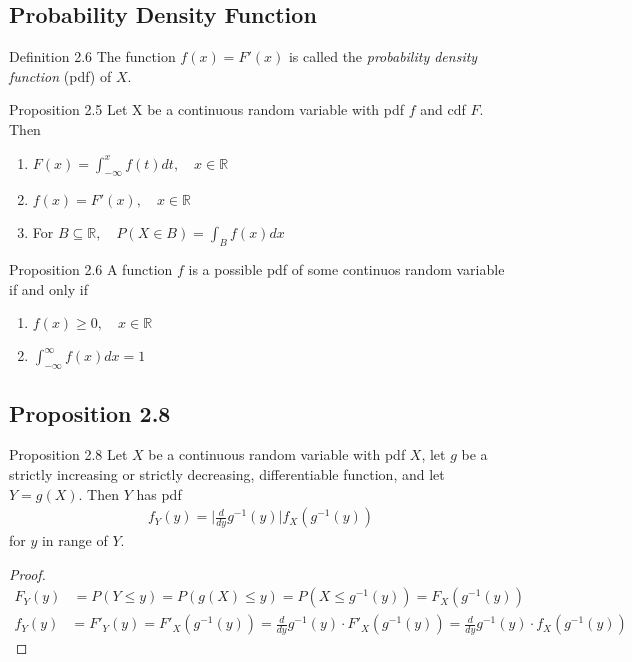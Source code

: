 \subsection{Probability Density Function}
\begin{boks}{Definition 2.6}
The function $f(x) = F'(x)$ is called the \textit{probability density function} (pdf) of $X$.
\end{boks}
\begin{minipage}{0.7\textwidth}
  \begin{boks}{Proposition 2.5}
  Let X be a continuous random variable with pdf $f$ and cdf $F$. Then
  \vspace{5mm}
  \begin{enumerate}
      \item $F(x) = \int_{-\infty}^x f(t)dt, \quad x \in \mathbb{R}$
      \item $f(x) = F'(x), \quad x \in \mathbb{R}$
      \item For $B \subseteq \mathbb{R}, \quad P(X\in B) = \int_B f(x)dx$
  \end{enumerate}
  \end{boks}
\end{minipage}
\begin{boks}{Proposition 2.6}
A function $f$ is a possible pdf of some continuos random variable if and only if
\begin{enumerate}
    \item $f(x) \geq 0, \quad x \in \mathbb{R}$
    \item $\int_{-\infty}^\infty f(x)dx = 1$
\end{enumerate}
\end{boks}

\subsection{Proposition 2.8}
\begin{boks}{Proposition 2.8}
Let $X$ be a continuous random variable with pdf $X$, let $g$ be a strictly increasing or strictly decreasing, differentiable function, and let $Y = g(X)$. Then $Y$ has pdf
\begin{align*}
    f_Y(y) = \bigg| \frac{d}{dy}g^{-1}(y)\bigg| f_X(g^{-1}(y))
\end{align*}
for $y$ in range of $Y$.
\end{boks}
\begin{proof}
  \begin{align*}
      F_Y(y)&=P(Y\leq y)=P(g(X)\leq y)=P(X\leq g^{-1}(y))=F_X(g^{-1}(y))
  \end{align*}
  \begin{align*}
      f_Y(y)&=F'_Y(y)=F'_X(g^{-1}(y))= \frac{d}{dy}g^{-1}(y)\cdot F'_X(g^{-1}(y))=\frac{d}{dy}g^{-1}(y)\cdot f_X(g^{-1}(y))
  \end{align*}
\end{proof}

